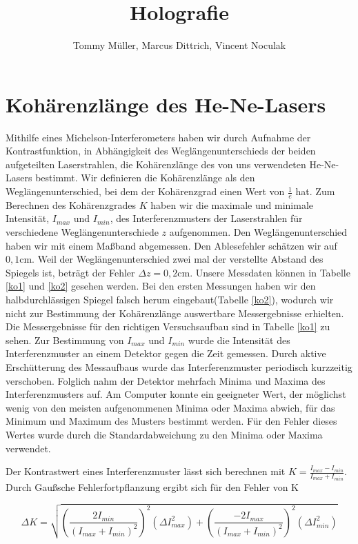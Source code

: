 \documentclass[10pt,a4paper]{article}
\author{Tommy Müller, Marcus Dittrich, Vincent Noculak}
\title{Holografie}
\begin{document}
\maketitle
\newpage
\tableofcontents
\newpage


\section{Kohärenzlänge des He-Ne-Lasers}

Mithilfe eines Michelson-Interferometers haben wir durch Aufnahme der Kontrastfunktion, in Abhängigkeit des Weglängenunterschieds der beiden aufgeteilten Laserstrahlen, die Kohärenzlänge des von uns verwendeten He-Ne-Lasers bestimmt. Wir definieren die Kohärenzlänge als den Weglängenunterschied, bei dem der Kohärenzgrad einen Wert von $\frac{1}{e}$ hat. Zum Berechnen des Kohärenzgrades $K$ haben wir die maximale und minimale Intensität, $I_{max}$ und $I_{min}$, des Interferenzmusters der Laserstrahlen für verschiedene Weglängenunterschiede $z$ aufgenommen. Den Weglängenunterschied haben wir mit einem Maßband abgemessen. Den Ablesefehler schätzen wir auf $0,1$cm. Weil der Weglängenunterschied zwei mal der verstellte Abstand des Spiegels ist, beträgt der Fehler $\Delta z = 0,2$cm. Unsere Messdaten können in Tabelle \ref{ko1} und \ref{ko2} gesehen werden. Bei den ersten Messungen haben wir den halbdurchlässigen Spiegel falsch herum eingebaut(Tabelle \ref{ko2}), wodurch wir nicht zur Bestimmung der Kohärenzlänge auswertbare Messergebnisse erhielten. Die Messergebnisse für den richtigen Versuchsaufbau sind in Tabelle \ref{ko1} zu sehen. Zur Bestimmung von $I_{max}$ und $I_{min}$ wurde die Intensität des Interferenzmuster an einem Detektor gegen die Zeit gemessen. Durch aktive Erschütterung des Messaufbaus wurde das Interferenzmuster periodisch kurzzeitig verschoben. Folglich nahm der Detektor mehrfach Minima und Maxima des Interferenzmusters auf. Am Computer konnte ein geeigneter Wert, der möglichst wenig von den meisten aufgenommenen Minima oder Maxima abwich, für das Minimum und Maximum des Musters bestimmt werden. Für den Fehler dieses Wertes wurde durch die Standardabweichung zu den Minima oder Maxima verwendet.

Der Kontrastwert eines Interferenzmuster lässt sich berechnen mit $K = \frac{I_{max} - I_{min}}{I_{max} + I_{min}}$. Durch Gaußsche Fehlerfortpflanzung ergibt sich für den Fehler von K

\begin{equation}
	\Delta K = \sqrt{\left(\frac{2I_{min}}{(I_{max} + I_{min})^2}\right)^2(\Delta I_{max}^2) + \left(\frac{-2I_{max}}{(I_{max} + I_{min})^2}\right)^2(\Delta I_{min}^2)}
\end{equation}
\end{document}
